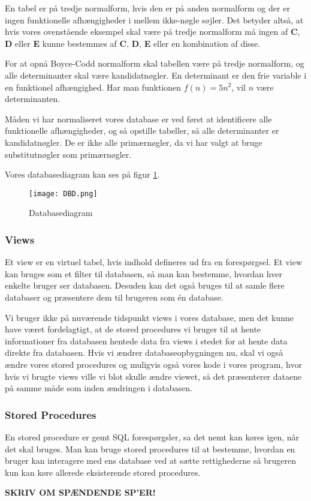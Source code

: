 En tabel er på tredje normalform, hvis den er på anden normalform og der er ingen funktionelle afhængigheder i mellem ikke-nøgle søjler.
Det betyder altså, at hvis vores ovenstående eksempel skal være på tredje normalform må ingen af \textbf{C}, \textbf{D} eller \textbf{E} kunne bestemmes af \textbf{C}, \textbf{D}, \textbf{E} eller en kombination af disse.

For at opnå Boyce-Codd normalform skal tabellen være på tredje normalform, og alle determinanter skal være kandidatnøgler.
En determinant er den frie variable i en funktionel afhængighed. Har man funktionen \(f(n) = 5n^2 \), vil \(n\) være determinanten.\cite{database}

Måden vi har normaliseret vores database er ved først at identificere alle funktionelle afhængigheder, og så opstille tabeller, så alle determinanter er kandidatnøgler.
De er ikke alle primærnøgler, da vi har valgt at bruge substitutnøgler som primærnøgler.

Vores databasediagram kan ses på figur \ref{databasediagram}.

\begin{figure}[h]
    \caption{Databasediagram}
    \centering
        \texttt{[image: DBD.png]}
    \label{databasediagram}
\end{figure}

\subsubsection{Views}

Et view er en virtuel tabel, hvis indhold defineres ud fra en forespørgsel.
Et view kan bruges som et filter til databasen, så man kan bestemme, hvordan hver enkelte bruger ser databasen.
Desuden kan det også bruges til at samle flere databaser og præsentere dem til brugeren som én database.

Vi bruger ikke på nuværende tidspunkt views i vores database, men det kunne have været fordelagtigt, at de stored procedures vi bruger til at hente informationer fra databasen hentede data fra views i stedet for at hente data direkte fra databasen.
Hvis vi ændrer databaseopbygningen nu, skal vi også ændre vores stored procedures og muligvis også vores kode i vores program, hvor hvis vi brugte views ville vi blot skulle ændre viewet, så det præsenterer dataene på samme måde som inden ændringen i databasen.

\subsubsection{Stored Procedures}
En stored procedure er gemt SQL forespørgsler, sa det nemt kan køres igen, når det skal bruges.
Man kan bruge stored procedures til at bestemme, hvordan en bruger kan interagere med ens database ved at sætte rettighederne så brugeren kun kan køre allerede eksisterende stored procedures.

\textbf{SKRIV OM SPÆNDENDE SP'ER!}
